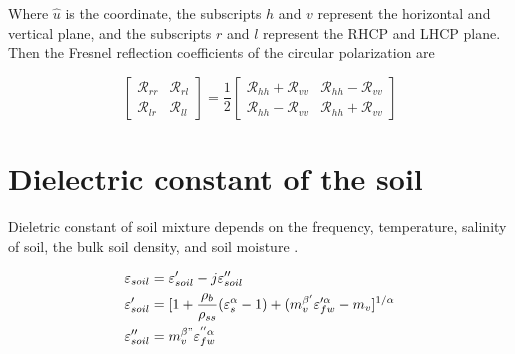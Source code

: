 \documentclass[draftcls,onecolumn]{IEEEtran}  %
\begin{document}
Where $\hat{u}$ is the coordinate, the subscripts $h$ and $v$ represent the horizontal and vertical plane, and the subscripts $r$ and $l$ represent the RHCP and LHCP plane. Then the Fresnel reflection coefficients of the circular polarization are

\begin{equation}
	\begin{bmatrix}
	\mathcal{R}_{rr} & \mathcal{R}_{rl} \\
	\mathcal{R}_{lr} & \mathcal{R}_{ll}
	\end{bmatrix} = 
	\frac{1}{2}
	\begin{bmatrix}
	\mathcal{R}_{hh} + \mathcal{R}_{vv} & \mathcal{R}_{hh} - \mathcal{R}_{vv} \\
	\mathcal{R}_{hh} - \mathcal{R}_{vv} & \mathcal{R}_{hh} + \mathcal{R}_{vv}		\end{bmatrix}
\end{equation}





\section{Dielectric constant of the soil}
\label{sec:DC_soil}
Dieletric constant of soil mixture depends on the frequency, temperature, salinity of soil, the bulk soil density, and soil moisture \cite{Peplinski:1995,Peplinski_correct:1995}.

\begin{equation} \label{eq: soil_dielectric_main}
\begin{split}
		 { \varepsilon_{soil} } &=  { \varepsilon'_{soil} } -j { \varepsilon''_{soil} } \\
    	 { \varepsilon'_{soil} } &= [1 + \frac{\rho_b}{\rho_{ss}} ( {\varepsilon_{s}^{\alpha}}-1) + (m_v^{\beta'}\varepsilon_{fw}^{\prime\alpha}-m_v]^{1/\alpha} \\
         { \varepsilon''_{soil} } &=m_v^{\beta"}\varepsilon_{fw}^{''\alpha}
\end{split}
\end{equation}
\end{document}
